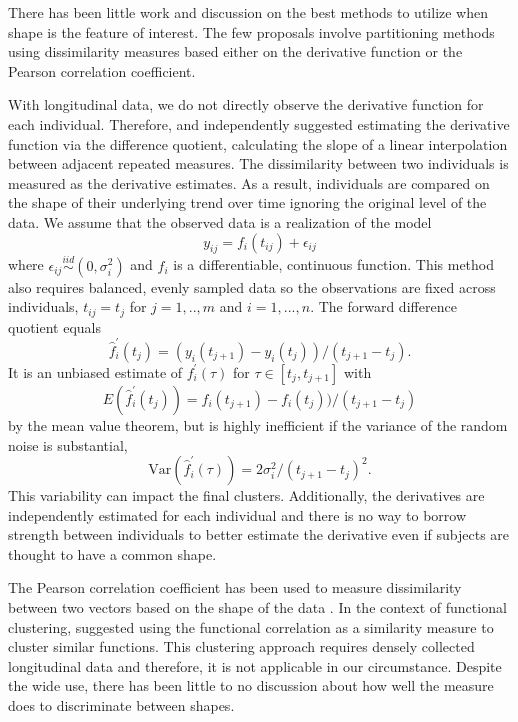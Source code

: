 \documentclass[12pt]{article}
\begin{document}
There has been little work and discussion on the best methods to utilize when shape is the feature of interest. The few proposals involve partitioning methods using dissimilarity measures based either on the derivative function or the Pearson correlation coefficient. 

With longitudinal data, we do not directly observe the derivative function for each individual. Therefore, \citet{moller2003} and \citet{d2000} independently suggested estimating the derivative function via the difference quotient, calculating the slope of a linear interpolation between adjacent repeated measures. The dissimilarity between two individuals is measured as the derivative estimates. As a result, individuals are compared on the shape of their underlying trend over time ignoring the original level of the data. We assume that the observed data is a realization of the model
$$y_{ij}= f_i(t_{ij})+\epsilon_{ij}$$
where $\epsilon_{ij}\overset{iid}{\sim} (0,\sigma_{i}^{2})$ and $f_{i}$ is a differentiable, continuous function. This method also requires balanced, evenly sampled data so the observations are fixed across individuals, $t_{ij} = t_{j}$ for $j=1,..,m$ and $i=1,...,n$. The forward difference quotient equals 
$$\hat{f}_{i}^{'}(t_{j}) = (y_i(t_{j+1})-y_i(t_j))/(t_{j+1}-t_j).$$
It is an unbiased estimate of $f_{i}^{'}(\tau)$ for $\tau\in[t_{j},t_{j+1}]$ with
$$E(\hat{f}_{i}^{'}(t_{j})) = f_i(t_{j+1})-f_i(t_j))/(t_{j+1}-t_j)$$
by the mean value theorem, but is highly inefficient if the variance of the random noise is substantial,
$$\text{Var}(\hat{f}_{i}^{'}(\tau)) =  2\sigma^{2}_{i}/ (t_{j+1}-t_j)^{2}.$$
This variability can impact the final clusters. Additionally, the derivatives are independently estimated for each individual and there is no way to borrow strength between individuals to better estimate the derivative even if subjects are thought to have a common shape. 

The Pearson correlation coefficient has been used to measure dissimilarity between two vectors based on the shape of the data  \cite{chouakria2007,  eisen1998, chiou2008}. In the context of functional clustering, \citet{chiou2008} suggested using the functional correlation as a similarity measure to cluster similar functions. This clustering approach requires densely collected longitudinal data and therefore, it is not applicable in our circumstance. Despite the wide use, there has been little to no discussion about how well the measure does to discriminate between shapes.
\end{document}
